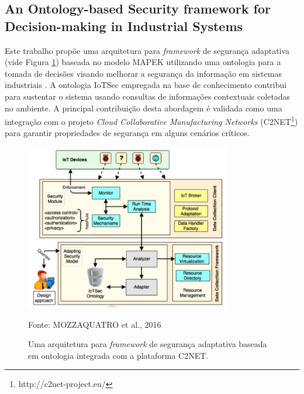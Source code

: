 \documentclass[tid,table]{texufpel} %
\begin{document}


\subsection{An Ontology-based Security framework for Decision-making in Industrial Systems} %

Este trabalho propõe uma arquitetura para \textit{framework} de segurança adaptativa (vide Figura \ref{iotsec-architecture}) baseada no modelo MAPEK utilizando uma ontologia para a tomada de decisões visando melhorar a segurança da informação em sistemas industriais \cite{mozzaquatro16}. A ontologia IoTSec \cite{mozzaquatro15} empregada na base de conhecimento contribui para sustentar o sistema usando consultas de informações contextuais coletadas no ambiente. A principal contribuição desta abordagem é validada como uma integração com o projeto \textit{Cloud Collaborative Manufacturing Networks} (C2NET\footnote{http://c2net-project.eu/}) para garantir propriedades de segurança em alguns cenários críticos.

\begin{figure}[ht]
\centering
\includegraphics[width=0.8\textwidth]{imagens/iotsec-architecture.png}
\caption{Uma arquitetura para \textit{framework} de segurança adaptativa baseada em ontologia integrada com a plataforma C2NET.}
\label{iotsec-architecture}
Fonte: MOZZAQUATRO et al., 2016\nocite{mozzaquatro16}
\end{figure}
\end{document}
